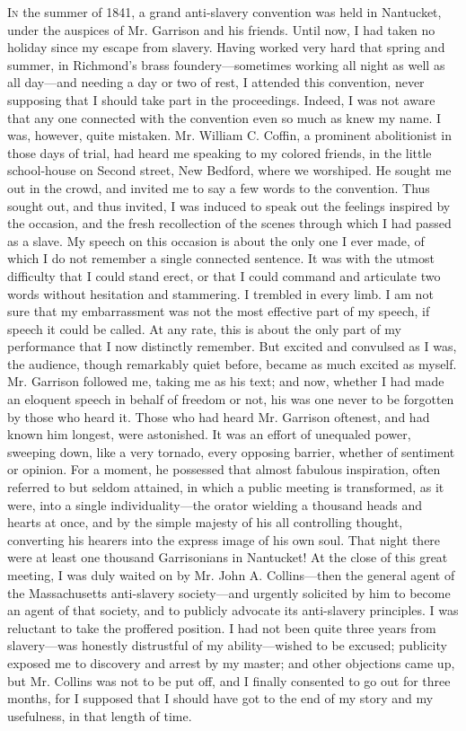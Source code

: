 \textsc{In} the summer of 1841, a grand anti-slavery convention was held
in Nantucket, under the auspices of Mr. Garrison and his friends. Until
now, I had taken no holiday since my escape from slavery. Having worked
very hard that spring and summer, in Richmond's brass
foundery---sometimes working all night as well as all day---and needing
a day or two of rest, I attended this convention, never supposing that I
should take part in the proceedings. Indeed, I was not aware that any
one connected with the convention even so much as knew my name. I was,
however, quite mistaken. Mr. William C. Coffin, a prominent abolitionist
in those days of trial, had heard me speaking to my colored friends, in
the little school-house on Second street, New Bedford, where we
worshiped. He sought me out in the crowd, and invited me to say a few
words to the convention. Thus sought out, and thus invited, I was
induced to speak {\protect\hypertarget{358}{}{}}out the feelings
inspired by the occasion, and the fresh recollection of the scenes
through which I had passed as a slave. My speech on this occasion is
about the only one I ever made, of which I do not remember a single
connected sentence. It was with the utmost difficulty that I could stand
erect, or that I could command and articulate two words without
hesitation and stammering. I trembled in every limb. I am not sure that
my embarrassment was not the most effective part of my speech, if speech
it could be called. At any rate, this is about the only part of my
performance that I now distinctly remember. But excited and convulsed as
I was, the audience, though remarkably quiet before, became as much
excited as myself. Mr. Garrison followed me, taking me as his text; and
now, whether I had made an eloquent speech in behalf of freedom or not,
his was one never to be forgotten by those who heard it. Those who had
heard Mr. Garrison oftenest, and had known him longest, were astonished.
It was an effort of unequaled power, sweeping down, like a very tornado,
every opposing barrier, whether of sentiment or opinion. For a moment,
he possessed that almost fabulous inspiration, often referred to but
seldom attained, in which a public meeting is transformed, as it were,
into a single individuality---the orator wielding a thousand heads and
hearts at once, and by the simple majesty of his all controlling
thought, converting his hearers into the express image of his own soul.
That night there were at least one thousand Garrisonians in Nantucket!
At the close of this great meeting, I was duly waited on by
{\protect\hypertarget{359}{}{}}Mr. John A. Collins---then the general
agent of the Massachusetts anti-slavery society---and urgently solicited
by him to become an agent of that society, and to publicly advocate its
anti-slavery principles. I was reluctant to take the proffered position.
I had not been quite three years from slavery---was honestly distrustful
of my ability---wished to be excused; publicity exposed me to discovery
and arrest by my master; and other objections came up, but Mr. Collins
was not to be put off, and I finally consented to go out for three
months, for I supposed that I should have got to the end of my story and
my usefulness, in that length of time.


